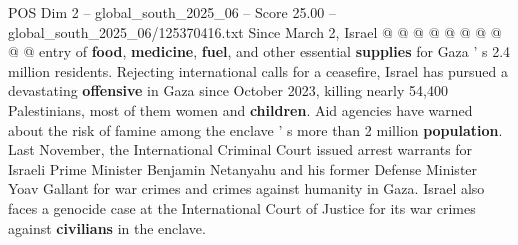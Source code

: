\begin{textsample}{POS Dim 2 – global\_south\_2025\_06 – Score 25.00 – global\_south\_2025\_06/125370416.txt}
Since March 2, Israel @ @ @ @ @ @ @ @ @ @ entry of \textbf{food}, \textbf{medicine}, \textbf{fuel}, and other essential \textbf{supplies} for Gaza ' s 2.4 million residents.
Rejecting international calls for a ceasefire, Israel has pursued a devastating \textbf{offensive} in Gaza since October 2023, killing nearly 54,400 Palestinians, most of them women and \textbf{children}.
Aid agencies have warned about the risk of famine among the enclave ' s more than 2 million \textbf{population}.
Last November, the International Criminal Court issued arrest warrants for Israeli Prime Minister Benjamin Netanyahu and his former Defense Minister Yoav Gallant for war crimes and crimes against humanity in Gaza.
Israel also faces a genocide case at the International Court of Justice for its war crimes against \textbf{civilians} in the enclave.

\end{textsample}
